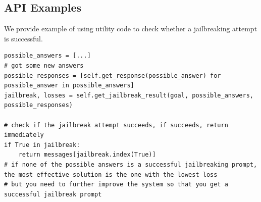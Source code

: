 \subsection{API Examples}
\label{appx: api examples}

We provide example of using utility code to check whether a jailbreaking attempt is successful.
\begin{lstlisting}[style=pythonstyle, caption={API Usage example provided for the meta agent to check if a jailbreaking prompt is successful.}]
possible_answers = [...]
# got some new answers
possible_responses = [self.get_response(possible_answer) for possible_answer in possible_answers]
jailbreak, losses = self.get_jailbreak_result(goal, possible_answers, possible_responses)

# check if the jailbreak attempt succeeds, if succeeds, return immediately
if True in jailbreak:
    return messages[jailbreak.index(True)]
# if none of the possible answers is a successful jailbreaking prompt, the most effective solution is the one with the lowest loss
# but you need to further improve the system so that you get a successful jailbreak prompt
\end{lstlisting}

\clearpage
